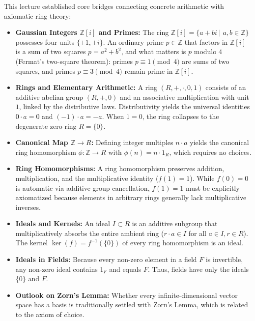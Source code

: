 \begin{overview}
This lecture established core bridges connecting concrete arithmetic with axiomatic ring theory:
\begin{itemize}
    \item \textbf{Gaussian Integers $\mathbb{Z}[i]$ and Primes:} The ring $\mathbb{Z}[i] = \{a + bi \mid a, b \in \mathbb{Z}\}$ possesses four units $\{\pm 1, \pm i\}$. An ordinary prime $p \in \mathbb{Z}$ that factors in $\mathbb{Z}[i]$ is a sum of two squares $p = a^2 + b^2$, and what matters is $p$ modulo $4$ (Fermat's two-square theorem): primes $p \equiv 1 \pmod 4$ are sums of two squares, and primes $p \equiv 3 \pmod 4$ remain prime in $\mathbb{Z}[i]$.
    \item \textbf{Rings and Elementary Arithmetic:} A ring $(R, +, \cdot, 0, 1)$ consists of an additive abelian group $(R, +, 0)$ and an associative multiplication with unit $1$, linked by the distributive laws. Distributivity yields the universal identities $0 \cdot a = 0$ and $(-1) \cdot a = -a$. When $1 = 0$, the ring collapses to the degenerate zero ring $R = \{0\}$.
    \item \textbf{Canonical Map $\mathbb{Z} \to R$:} Defining integer multiples $n \cdot a$ yields the canonical ring homomorphism $\phi \colon \mathbb{Z} \to R$ with $\phi(n) = n \cdot 1_R$, which requires no choices.
    \item \textbf{Ring Homomorphisms:} A ring homomorphism preserves addition, multiplication, and the multiplicative identity ($f(1) = 1$). While $f(0) = 0$ is automatic via additive group cancellation, $f(1) = 1$ must be explicitly axiomatized because elements in arbitrary rings generally lack multiplicative inverses.
    \item \textbf{Ideals and Kernels:} An ideal $I \subset R$ is an additive subgroup that multiplicatively absorbs the entire ambient ring ($r \cdot a \in I$ for all $a \in I, r \in R$). The kernel $\ker(f) = f^{-1}(\{0\})$ of every ring homomorphism is an ideal.
    \item \textbf{Ideals in Fields:} Because every non-zero element in a field $F$ is invertible, any non-zero ideal contains $1_F$ and equals $F$. Thus, fields have only the ideals $\{0\}$ and $F$.
    \item \textbf{Outlook on Zorn's Lemma:} Whether every infinite-dimensional vector space has a basis is traditionally settled with Zorn's Lemma, which is related to the axiom of choice.
\end{itemize}
\end{overview}
